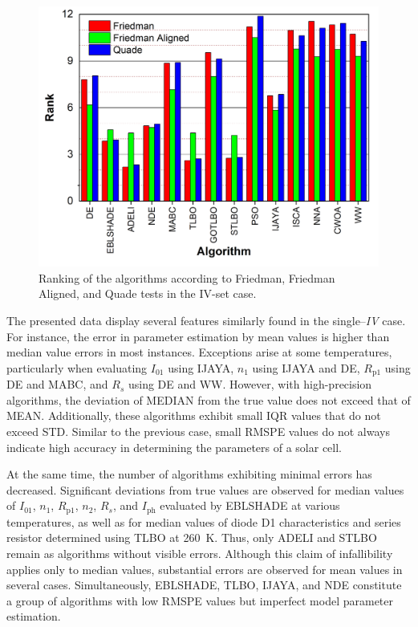 \documentclass[a4paper,fleqn]{cas-sc}
\begin{document}
\begin{figure}[]
	\centering
		\includegraphics[width=0.5\columnwidth]{FigRankT}
	  \caption{Ranking of the algorithms according to Friedman, Friedman Aligned, and Quade tests in the IV-set case.}\label{figRankIVset}
\end{figure}



The presented data display several features similarly found in the single--\emph{IV} case.
For instance, the error in parameter estimation by mean values is higher than median value errors in most instances.
Exceptions arise at some temperatures,
particularly when evaluating $I_{01}$ using IJAYA,
$n_1$ using IJAYA and DE,
$R_\mathrm{p1}$ using DE and MABC,
and $R_s$ using DE and WW.
However, with high-precision algorithms, the deviation of MEDIAN from
the true value does not exceed that of MEAN.
Additionally, these algorithms exhibit small IQR values that do not exceed STD.
Similar to the previous case, small RMSPE values do not always indicate high accuracy
in determining the parameters of a solar cell.


At the same time, the number of algorithms exhibiting minimal errors has decreased.
Significant deviations from true values are observed for median values
of $I_{01}$, $n_{1}$, $R_\mathrm{p1}$, $n_2$, $R_s$, and $I_\mathrm{ph}$ evaluated by EBLSHADE at various temperatures,
as well as for median values of diode D1 characteristics and series resistor determined using TLBO at 260~K.
Thus, only ADELI and STLBO remain as algorithms without visible errors.
Although this claim of infallibility applies only to median values,
substantial errors are observed for mean values in several cases.
Simultaneously, EBLSHADE, TLBO, IJAYA, and NDE constitute a group of algorithms with low RMSPE values
but imperfect model parameter estimation.
\end{document}
